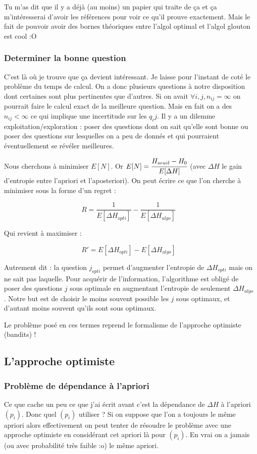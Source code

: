 \documentclass[12pt]{article}
\begin{document}
\vspace{2mm}
Tu m'as dit que il y a déjà (au moins) un papier qui traite de ça et ça m'intéresserai d'avoir les références pour voir ce qu'il prouve exactement. Mais le fait de pouvoir avoir des bornes théoriques entre l'algol optimal et l'algol glouton est cool :O

\subsubsection{Determiner la bonne question}
C'est là où je trouve que ça devient intéressant. Je laisse pour l'instant de coté le problème du temps de calcul. On a donc plusieurs questions à notre disposition dont certaines sont plus pertinentes que d'autres. Si on avait $\forall i,j, n_{ij} = \infty$ on pourrait faire le calcul exact de la meilleure question. Mais en fait on a des $n_{ij} < \infty$ ce qui implique une incertitude sur les $q_ij$. Il y a un dilemme exploitation/exploration : poser des questions dont on sait qu'elle sont bonne ou poser des questions sur lesquelles on a peu de donnés et qui pourraient éventuellement se révéler meilleures. 

Nous cherchons à minimiser $E[N]$. Or $E[N] = \cfrac{H_{seuil} - H_0}{E[\Delta H]}$ (avec $\Delta H$ le gain d'entropie entre l'apriori et l'aposteriori). On peut  écrire ce que l'on cherche à minimiser sous la forme d'un regret : 

\[ R = \frac{1}{E[\Delta H_{opti}]} - \frac{1}{E[\Delta H_{algo}]} \]

Qui revient à maximiser : 

\[R' = E[\Delta H_{opti}] - E[\Delta H_{algo}] \]

Autrement dit : la question $j_{opti}$ permet d'augmenter l'entropie de $\Delta H_{opti}$ mais on ne sait pas laquelle. Pour acquérir de l'information, l'algorithme est obligé de poser des questions $j$ sous optimale en augmentant l'entropie de seulement $\Delta H_{algo}$. Notre but est de choisir le moins souvent possible les $j$ sous optimaux, et d'autant moins souvent qu'ils sont sous optimaux. 

\vspace{2mm}
Le problème posé en ces termes reprend le formalisme de l'approche optimiste (bandits) !

\subsection{L'approche optimiste} 
\subsubsection{Problème de dépendance à l'apriori}
Ce que cache un peu ce que j'ai écrit avant c'est la dépendance de $\Delta H$ à l'apriori $(p_i)$. Donc quel $(p_i)$ utiliser ? Si on suppose que l'on a toujours le même apriori alors effectivement on peut tenter de résoudre le problème avec une approche optimiste en considérant cet apriori là pour $(p_i)$. En vrai on a jamais (ou avec probabilité très faible :o) le même apriori. 
\end{document}
